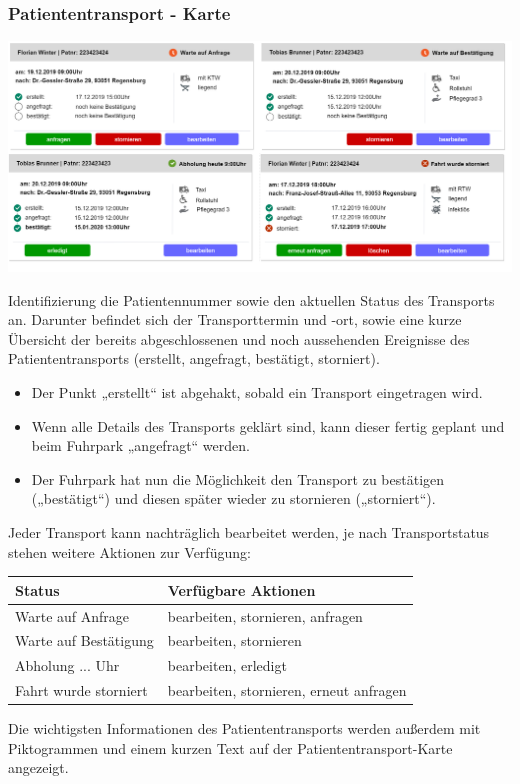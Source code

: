 \documentclass[a4paper, ngerman, 12pt]{scrartcl}
\begin{document}
\subsubsection{Patiententransport - Karte}
\begin{center}
\begin{minipage}{0.8\textwidth}
	\centering
	\includegraphics[width=\textwidth]{Bilder/ap1Card.png}
	\label{img:ap1card}
\end{minipage}
\end{center}
Identifizierung die Patientennummer sowie den aktuellen Status des Transports an. Darunter befindet sich der Transporttermin und -ort, sowie eine kurze Übersicht der bereits abgeschlossenen und noch aussehenden Ereignisse des Patiententransports (erstellt, angefragt, bestätigt, storniert).\\
\begin{itemize}
\item Der Punkt „erstellt“ ist abgehakt, sobald ein Transport eingetragen wird.
\item Wenn alle Details des Transports geklärt sind, kann dieser fertig geplant und beim Fuhrpark „angefragt“ werden.
\item Der Fuhrpark hat nun die Möglichkeit den Transport zu bestätigen („bestätigt“) und diesen später wieder zu stornieren („storniert“).
\end{itemize}
Jeder Transport kann nachträglich bearbeitet werden, je nach Transportstatus stehen weitere Aktionen zur Verfügung:\\
\begin{center}
\begin{tabular}{|p{}|p{}|}
\hline
\cellcolor{lightgray}\textbf{Status}	&\cellcolor{lightgray}\textbf{Verfügbare Aktionen}\\
\hline
Warte auf Anfrage	&bearbeiten, stornieren, anfragen\\
\hline
Warte auf Bestätigung	&bearbeiten, stornieren\\
\hline
Abholung ... Uhr	&bearbeiten, erledigt\\
\hline
Fahrt wurde storniert	&bearbeiten, stornieren, erneut anfragen\\
\hline
\end{tabular}
\end{center}
Die wichtigsten Informationen des Patiententransports werden außerdem mit Piktogrammen und einem kurzen Text auf der Patiententransport-Karte angezeigt.
\end{document}
